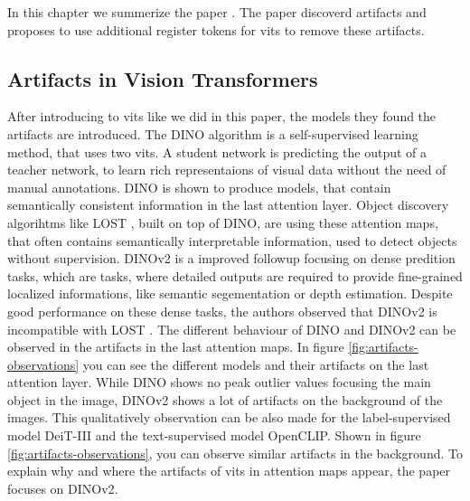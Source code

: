 \documentclass[conference]{IEEEtran}
\begin{document}
  In this chapter we summerize the paper \cite{registers}. The paper discoverd artifacts and proposes to use additional register tokens for \acp{vit} to remove these artifacts.

  \subsection{Artifacts in Vision Transformers}



  After introducing to \acp{vit} like we did in this paper, the models they found the artifacts are introduced. The \mbox{DINO} algorithm is a self-supervised learning method, that uses two \acp{vit}. A student network is predicting the output of a teacher network, to learn rich representaions of visual data without the need of manual annotations. \cite{dino} \mbox{DINO} is shown to produce models, that contain semantically consistent information in the last attention layer. Object discovery algorihtms like \mbox{LOST} \cite{lost}, built on top of \mbox{DINO}, are using these attention maps, that often contains semantically interpretable information, used to detect objects without supervision. \mbox{DINOv2} \cite{dinov2} is a improved followup focusing on dense predition tasks, which are tasks, where detailed outputs are required to provide fine-grained localized informations, like semantic segementation or depth estimation. Despite good performance on these dense tasks, the authors observed that \mbox{DINOv2} is incompatible with \mbox{LOST} \cite{registers}. The different behaviour of \mbox{DINO} and \mbox{DINOv2} can be observed in the artifacts in the last attention maps. In figure \ref{fig:artifacts-observations} you can see the different models and their artifacts on the last attention layer.
  While \mbox{DINO} shows no peak outlier values focusing the main object in the image, \mbox{DINOv2} shows a lot of artifacts on the background of the images. This qualitatively observation can be also made for the label-supervised model \mbox{DeiT-III} and the text-supervised model \mbox{OpenCLIP}. Shown in figure \ref{fig:artifacts-observations}, you can observe similar artifacts in the background.
  To explain why and where the artifacts of \acp{vit} in attention maps appear, the paper focuses on \mbox{DINOv2}. 
\end{document}
